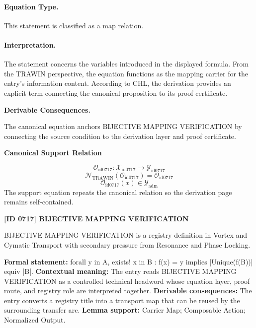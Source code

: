 \paragraph{Equation Type.}
This statement is classified as a map relation.

\paragraph{Interpretation.}
The statement concerns the variables introduced in the displayed formula. From the TRAWIN perspective, the equation functions as the mapping carrier for the entry’s information content. According to CHL, the derivation provides an explicit term connecting the canonical proposition to its proof certificate.

\par\vspace{0.35em}
\noindent\textbf{Derivable Consequences.}\quad
\begingroup
\footnotesize
\raggedright
The canonical equation anchors BIJECTIVE MAPPING VERIFICATION by connecting the source condition to the derivation layer and proof certificate.
\par\endgroup

\noindent\textbf{Canonical Support Relation}\par
\[
\mathcal{O}_{\mathrm{id0717}}:\mathcal{X}_{\mathrm{id0717}}\longrightarrow\mathcal{Y}_{\mathrm{id0717}}
\]
\[
\mathcal{N}_{\mathrm{TRAWIN}}(\mathcal{O}_{\mathrm{id0717}})=\mathcal{O}_{\mathrm{id0717}}
\]
\[
\mathcal{O}_{\mathrm{id0717}}(x)\in\mathcal{Y}_{\mathrm{adm}}
\]
\noindent The support equation repeats the canonical relation so the derivation page remains self-contained.\par

\clearpage
\noindent\textbf{[ID 0717] BIJECTIVE MAPPING VERIFICATION}\par
\vspace{0.35em}
\begingroup\small
{}
BIJECTIVE MAPPING VERIFICATION is a registry definition in Vortex and Cymatic Transport with secondary pressure from Resonance and Phase Locking.

\begingroup\footnotesize\setlength{\emergencystretch}{3em}\sloppy
\textbf{Formal statement:} forall y in A, exists! x in B : f(x) = y implies |Unique(f(B))| equiv |B|. \textbf{Contextual meaning:} The entry reads BIJECTIVE MAPPING VERIFICATION as a controlled technical headword whose equation layer, proof route, and registry role are interpreted together. \textbf{Derivable consequences:} The entry converts a registry title into a transport map that can be reused by the surrounding transfer arc. \textbf{Lemma support:} Carrier Map; Composable Action; Normalized Output.\par
\endgroup

